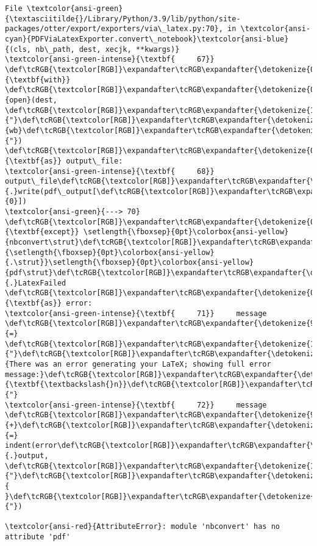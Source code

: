 \documentclass[11pt]{article}
\begin{document}
\begin{Verbatim}[commandchars=\\\{\}, frame=single, framerule=2mm, rulecolor=\color{outerrorbackground}]
File \textcolor{ansi-green}{\textasciitilde{}/Library/Python/3.9/lib/python/site-packages/otter/export/exporters/via\_latex.py:70}, in \textcolor{ansi-cyan}{PDFViaLatexExporter.convert\_notebook}\textcolor{ansi-blue}{(cls, nb\_path, dest, xecjk, **kwargs)}
\textcolor{ansi-green-intense}{\textbf{     67}}     \def\tcRGB{\textcolor[RGB]}\expandafter\tcRGB\expandafter{\detokenize{0,135,0}}{\textbf{with}} \def\tcRGB{\textcolor[RGB]}\expandafter\tcRGB\expandafter{\detokenize{0,135,0}}{open}(dest, \def\tcRGB{\textcolor[RGB]}\expandafter\tcRGB\expandafter{\detokenize{175,0,0}}{"}\def\tcRGB{\textcolor[RGB]}\expandafter\tcRGB\expandafter{\detokenize{175,0,0}}{wb}\def\tcRGB{\textcolor[RGB]}\expandafter\tcRGB\expandafter{\detokenize{175,0,0}}{"}) \def\tcRGB{\textcolor[RGB]}\expandafter\tcRGB\expandafter{\detokenize{0,135,0}}{\textbf{as}} output\_file:
\textcolor{ansi-green-intense}{\textbf{     68}}         output\_file\def\tcRGB{\textcolor[RGB]}\expandafter\tcRGB\expandafter{\detokenize{98,98,98}}{.}write(pdf\_output[\def\tcRGB{\textcolor[RGB]}\expandafter\tcRGB\expandafter{\detokenize{98,98,98}}{0}])
\textcolor{ansi-green}{---> 70} \def\tcRGB{\textcolor[RGB]}\expandafter\tcRGB\expandafter{\detokenize{0,135,0}}{\textbf{except}} \setlength{\fboxsep}{0pt}\colorbox{ansi-yellow}{nbconvert\strut}\def\tcRGB{\textcolor[RGB]}\expandafter\tcRGB\expandafter{\detokenize{98,98,98}}{\setlength{\fboxsep}{0pt}\colorbox{ansi-yellow}{.\strut}}\setlength{\fboxsep}{0pt}\colorbox{ansi-yellow}{pdf\strut}\def\tcRGB{\textcolor[RGB]}\expandafter\tcRGB\expandafter{\detokenize{98,98,98}}{.}LatexFailed \def\tcRGB{\textcolor[RGB]}\expandafter\tcRGB\expandafter{\detokenize{0,135,0}}{\textbf{as}} error:
\textcolor{ansi-green-intense}{\textbf{     71}}     message \def\tcRGB{\textcolor[RGB]}\expandafter\tcRGB\expandafter{\detokenize{98,98,98}}{=} \def\tcRGB{\textcolor[RGB]}\expandafter\tcRGB\expandafter{\detokenize{175,0,0}}{"}\def\tcRGB{\textcolor[RGB]}\expandafter\tcRGB\expandafter{\detokenize{175,0,0}}{There was an error generating your LaTeX; showing full error message:}\def\tcRGB{\textcolor[RGB]}\expandafter\tcRGB\expandafter{\detokenize{175,95,0}}{\textbf{\textbackslash{}n}}\def\tcRGB{\textcolor[RGB]}\expandafter\tcRGB\expandafter{\detokenize{175,0,0}}{"}
\textcolor{ansi-green-intense}{\textbf{     72}}     message \def\tcRGB{\textcolor[RGB]}\expandafter\tcRGB\expandafter{\detokenize{98,98,98}}{+}\def\tcRGB{\textcolor[RGB]}\expandafter\tcRGB\expandafter{\detokenize{98,98,98}}{=} indent(error\def\tcRGB{\textcolor[RGB]}\expandafter\tcRGB\expandafter{\detokenize{98,98,98}}{.}output, \def\tcRGB{\textcolor[RGB]}\expandafter\tcRGB\expandafter{\detokenize{175,0,0}}{"}\def\tcRGB{\textcolor[RGB]}\expandafter\tcRGB\expandafter{\detokenize{175,0,0}}{    }\def\tcRGB{\textcolor[RGB]}\expandafter\tcRGB\expandafter{\detokenize{175,0,0}}{"})

\textcolor{ansi-red}{AttributeError}: module 'nbconvert' has no attribute 'pdf'
    \end{Verbatim}

    


    
    
    
\end{document}

